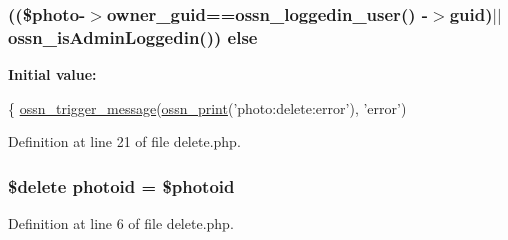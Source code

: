\subsubsection[{\texorpdfstring{else}{else}}]{ ((\$photo-\/$>${\bf owner\+\_\+guid}=={\bf ossn\+\_\+loggedin\+\_\+user}() -\/$>$guid)$\vert$$\vert${\bf ossn\+\_\+is\+Admin\+Loggedin}()) else}\hypertarget{components_2_ossn_photos_2actions_2photo_2profile_2delete_8php_a184756f75a17a1d7c2189795e74832b3}{}\label{components_2_ossn_photos_2actions_2photo_2profile_2delete_8php_a184756f75a17a1d7c2189795e74832b3}
{\bfseries Initial value\+:}
\begin{DoxyCode}
\{
        \hyperlink{ossn_8lib_8system_8php_ab3f23f23f32f50c12e7aea0ffaccaac7}{ossn\_trigger\_message}(\hyperlink{ossn_8lib_8languages_8php_a2be5d1c4b695593a9b9067b96df2150a}{ossn\_print}(\textcolor{stringliteral}{'photo:delete:error'}), \textcolor{stringliteral}{'error'})
\end{DoxyCode}


Definition at line 21 of file delete.\+php.

\subsubsection[{\texorpdfstring{photoid}{photoid}}]{\setlength{\rightskip}{0pt plus 5cm}\$delete photoid = \$photoid}\hypertarget{components_2_ossn_photos_2actions_2photo_2profile_2delete_8php_abb6af812fbce2cbbad5fc22cdbb4d396}{}\label{components_2_ossn_photos_2actions_2photo_2profile_2delete_8php_abb6af812fbce2cbbad5fc22cdbb4d396}


Definition at line 6 of file delete.\+php.

